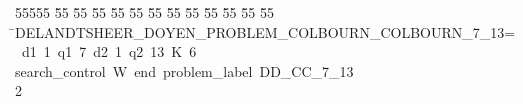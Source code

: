 %
%
\begin{tabbing}
55555 \= 55 \= 55 \= 55 \= 55 \= 55 \= 55 \= 55 \= 55 \= 55 \= 55 \= 55 \= 55 \= \>DELANDTSHEER\_DOYEN\_PROBLEM\_COLBOURN\_COLBOURN\_7\_13=\ d1\ 1\ q1\ 7\ d2\ 1\ q2\ 13\ K\ 6\ \\[0pt]
\>search\_control\ W\ end\ problem\_label\ DD\_CC\_7\_13\\[0pt]
2\>\end{tabbing}
